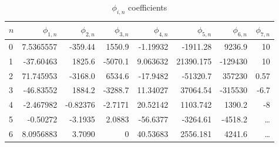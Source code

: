 \documentclass[english]{../thermomemo/thermomemo}
\begin{document}
\begin{table}[htb]
  \center
  \begin{tabular}{lrrrrrrr}
    \hline
    $n$ & $\phi_{1,n}$ & $\phi_{2,n}$ & $\phi_{3,n}$ & $\phi_{4,n}$ & $\phi_{5,n}$ & $\phi_{6,n}$ & $\phi_{7,n}$  \\
    \hline
    0 & 7.5365557 & -359.44 & 1550.9 & -1.19932 & -1911.28 & 9236.9 & 10\\
    1 & -37.60463 & 1825.6 & -5070.1 & 9.063632 & 21390.175 & -129430 & 10\\
    2 & 71.745953 & -3168.0 & 6534.6 & -17.9482 & -51320.7 & 357230 & 0.57 \\
    3 & -46.83552 & 1884.2 & -3288.7 & 11.34027 & 37064.54 & -315530 & -6.7 \\
    4 & -2.467982 & -0.82376 & -2.7171 & 20.52142 & 1103.742 & 1390.2 & -8 \\
    5 & -0.50272 & -3.1935 & 2.0883 & -56.6377 & -3264.61 & -4518.2 & \dots \\
    6 & 8.0956883 & 3.7090 & 0 & 40.53683 & 2556.181 & 4241.6 & \dots \\
    \hline
  \end{tabular}
  \caption{$\phi_{i,n}$ coefficients}
\end{table}
\end{document}
